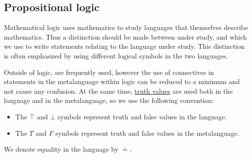\subsection{Propositional logic}\label{subsec:propositional_logic}

\begin{Remark}\label{remark:metalanguage}
  Mathematical logic uses mathematics to study languages that themselves describe mathematics. Thus a distinction should be made between  under study, and  which we use to write statements relating to the language under study. This distinction is often emphasized by using different logical symbols in the two languages.

  Outside of logic,  are frequently used, however the use of connectives in statements in the metalanguage within logic can be reduced to a minimum and not cause any confusion. At the same time, \hyperref[def:propositional_language/constants]{truth values} are used both in the language and in the metalanguage, so we use the following convention:
  \begin{itemize}
    \item The \( \top \) and \( \bot \) symbols represent truth and false values in the language.
    \item The \( T \) and \( F \) symbols represent truth and false values in the metalanguage.
  \end{itemize}

  We denote equality in the language by \( \doteq \).
\end{Remark}

